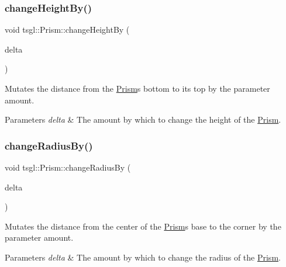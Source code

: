 \subsubsection{\texorpdfstring{change\+Height\+By()}{changeHeightBy()}}
{\footnotesize\ttfamily void tsgl\+::\+Prism\+::change\+Height\+By (\begin{DoxyParamCaption}\item[{G\+Lfloat}]{delta }\end{DoxyParamCaption})\hspace{0.3cm}{\ttfamily [virtual]}}



Mutates the distance from the \hyperlink{classtsgl_1_1_prism}{Prism}\textquotesingle{}s bottom to its top by the parameter amount. 


\begin{DoxyParams}{Parameters}
{\em delta} & The amount by which to change the height of the \hyperlink{classtsgl_1_1_prism}{Prism}. \\
\hline
\end{DoxyParams}
\mbox{\label{classtsgl_1_1_prism_ae16f2d46d3fb263d389bfcc2a45bda63}} 
\subsubsection{\texorpdfstring{change\+Radius\+By()}{changeRadiusBy()}}
{\footnotesize\ttfamily void tsgl\+::\+Prism\+::change\+Radius\+By (\begin{DoxyParamCaption}\item[{G\+Lfloat}]{delta }\end{DoxyParamCaption})\hspace{0.3cm}{\ttfamily [virtual]}}



Mutates the distance from the center of the \hyperlink{classtsgl_1_1_prism}{Prism}\textquotesingle{}s base to the corner by the parameter amount. 


\begin{DoxyParams}{Parameters}
{\em delta} & The amount by which to change the radius of the \hyperlink{classtsgl_1_1_prism}{Prism}. \\
\hline
\end{DoxyParams}
\mbox{\label{classtsgl_1_1_prism_abfdc091d8c61e889f61b71577b58e0b6}} 
